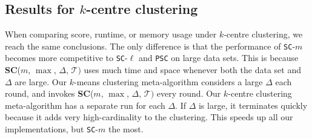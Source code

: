 \subsection{Results for $k$-centre clustering}
When comparing score, runtime, or memory usage under $k$-centre clustering, we reach the same conclusions. 
The only difference is that  the performance of \texttt{SC}-$m$ becomes more competitive to \texttt{SC}-$\ell$ and \texttt{PSC} on large data sets. 
This is because \textbf{SC}($m$,  $\max$, $\Delta$, $\mathcal{T})$ uses much time and space whenever both the data set and $\Delta$ are large. 
Our $k$-means clustering meta-algorithm considers a large $\Delta$ each round, and invokes \textbf{SC}($m$,  $\max$, $\Delta$, $\mathcal{T})$ every round.
%
%
Our $k$-centre clustering meta-algorithm has a separate run for each $\Delta$. If $\Delta$ is large, it terminates quickly because it adds very high-cardinality \pathlets to the clustering. 
This speeds up all our implementations, but \texttt{SC}-$m$ the most. 
%
%
%
